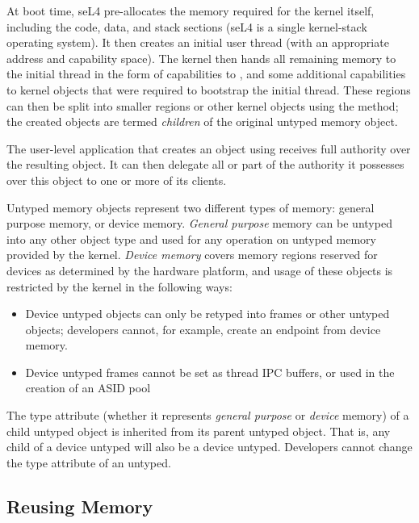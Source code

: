 At boot time, seL4 pre-allocates the memory required for the kernel
itself, including the code, data, and stack sections (seL4 is a single
kernel-stack operating system). It then creates an initial user
thread (with an appropriate address and capability space).
The kernel then hands all remaining memory to
the initial thread in the form of capabilities to , and
some additional capabilities to kernel objects that were required to
bootstrap the initial thread.  These  regions can then be split into
smaller regions or other kernel objects using the
 method; the created objects are termed \emph{children} of
the original untyped memory object.

The user-level application that creates an object using 
receives full authority over the resulting object. It can then delegate
all or part of the authority it possesses over this object to one or
more of its clients.

Untyped memory objects represent two different types of memory:
general purpose memory, or device memory.
\emph{General purpose} memory can be untyped into any other object
type and used for any operation on untyped memory provided by the kernel.
\emph{Device memory} covers memory regions reserved for devices
as determined by the hardware platform, and usage of these objects
is restricted by the kernel in the following ways:

\begin{itemize}
\item Device untyped objects can only be retyped into frames or other
untyped objects; developers cannot, for example, create an endpoint from device memory.
\item Device untyped frames cannot be set as thread IPC buffers, or used
in the creation of an ASID pool
\end{itemize}

The type attribute (whether it represents \emph{general purpose} or
\emph{device} memory) of a child untyped object is inherited from its
parent untyped object. That is, any child of a device untyped will
also be a device untyped. Developers cannot change the type attribute of an untyped.

\subsection{Reusing Memory}
\label{s:memRevoke}

